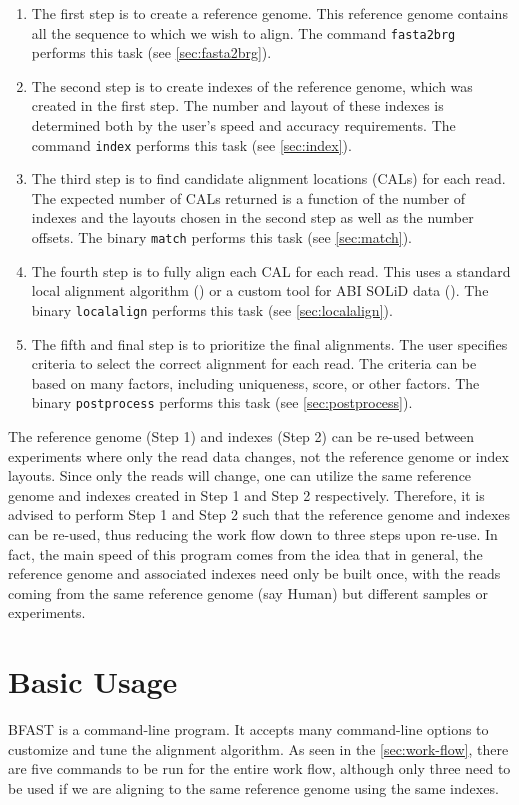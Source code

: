 \documentclass[a4paper,12pt]{book}
\newcommand{\TT}[1]{{\tt #1}} %
\begin{document}
\begin{enumerate}
	\item
		The first step is to create a reference genome.
		This reference genome contains all the sequence to which we wish to align.
		The command \TT{fasta2brg} performs this task (see \autoref{sec:fasta2brg}).
	\item
		The second step is to create indexes of the reference genome, which was created in the first step.
		The number and layout of these indexes is determined both by the user's speed and accuracy requirements.
		The command \TT{index} performs this task (see \autoref{sec:index}).
	\item
		The third step is to find candidate alignment locations (CALs) for each read.
		The expected number of CALs returned is a function of the number of indexes and the layouts chosen in the second step as well as the number offsets.
		The binary \TT{match} performs this task (see \autoref{sec:match}).
	\item
		The fourth step is to fully align each CAL for each read.
		This uses a standard local alignment algorithm (\cite{SmithWaterman}) or a custom tool for ABI SOLiD data (\cite{BFAST-local-alignment}).
		The binary \TT{localalign} performs this task (see \autoref{sec:localalign}).
	\item
		The fifth and final step is to prioritize the final alignments.
		The user specifies criteria to select the correct alignment for each read.
		The criteria can be based on many factors, including uniqueness, score, or other factors.
		The binary \TT{postprocess} performs this task (see \autoref{sec:postprocess}).
\end{enumerate}

The reference genome (Step 1) and indexes (Step 2) can be re-used between experiments where only the read data changes, not the reference genome or index layouts.
Since only the reads will change, one can utilize the same reference genome and indexes created in Step 1 and Step 2 respectively.
Therefore, it is advised to perform Step 1 and Step 2 such that the reference genome and indexes can be re-used, thus reducing the work flow down to three steps upon re-use.
In fact, the main speed of this program comes from the idea that in general, the reference genome and associated indexes need only be built once, with the reads coming from the same reference genome (say Human) but different samples or experiments.

\chapter{Basic Usage}
BFAST is a command-line program.
It accepts many command-line options to customize and tune the alignment algorithm.
As seen in the \autoref{sec:work-flow}, there are five commands to be run for the entire work flow, although only three need to be used if we are aligning to the same reference genome using the same indexes.
\end{document}
